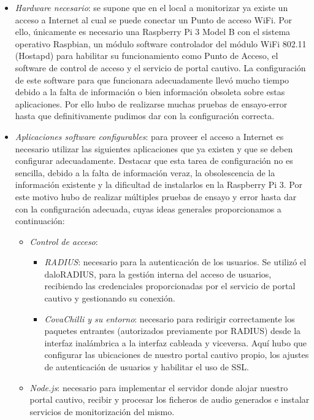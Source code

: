 \begin{itemize}
\item \emph{Hardware necesario}: se supone que en el local a monitorizar ya existe un acceso a Internet al cual se puede conectar un Punto de acceso WiFi. Por ello, únicamente es necesario una Raspberry Pi 3 Model B con el sistema operativo Raspbian, un módulo software controlador del módulo WiFi 802.11 (Hostapd) para habilitar su funcionamiento como Punto de Acceso, el software de control de acceso y el servicio de portal cautivo. La configuración de este software para que funcionara adecuadamente llevó mucho tiempo debido a la falta de información o bien información obsoleta sobre estas aplicaciones. Por ello hubo de realizarse muchas pruebas de ensayo-error hasta que definitivamente pudimos dar con la configuración correcta.
\item \emph{Aplicaciones software configurables}: para proveer el acceso a Internet es necesario utilizar las siguientes aplicaciones que ya existen y que se deben configurar adecuadamente. Destacar que esta tarea de configuración no es sencilla, debido a la falta de información veraz, la obsolescencia de la información existente y la dificultad de instalarlos en la Raspberry Pi 3. Por este motivo hubo de realizar múltiples pruebas de ensayo y error hasta dar con la configuración adecuada, cuyas ideas generales proporcionamos a continuación:
\begin{itemize}
\item \emph{Control de acceso}:
\begin{itemize}
\item \emph{RADIUS}: necesario para la autenticación de los usuarios. Se utilizó el daloRADIUS, para la gestión interna del acceso de usuarios, recibiendo las credenciales proporcionadas por el servicio de portal cautivo y gestionando su conexión.
\item \emph{CovaChilli y su entorno}: necesario para redirigir correctamente los paquetes entrantes (autorizados previamente por RADIUS) desde la interfaz inalámbrica a la interfaz cableada y viceversa. Aquí hubo que configurar las ubicaciones de nuestro portal cautivo propio, los ajustes de autenticación de usuarios y habilitar el uso de \acrshort{SSL}.
\end{itemize}
\item \emph{Node.js}: necesario para implementar el servidor donde alojar nuestro portal cautivo, recibir y procesar los ficheros de audio generados e instalar servicios de monitorización del mismo.
\end{itemize}

\end{itemize}
